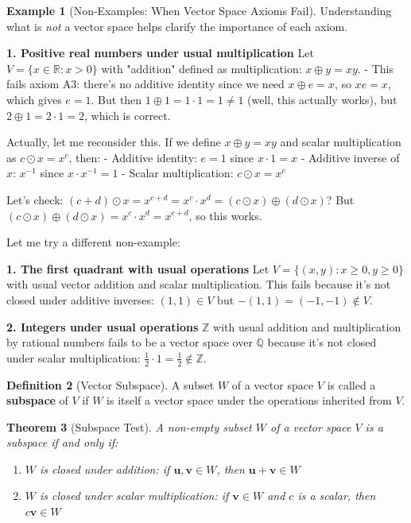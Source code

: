 \documentclass[12pt]{article}
\numberwithin{equation}{section}
\newcommand{\vect}[1]{\boldsymbol{#1}}   %
\theoremstyle{plain}
\newtheorem{theorem}{Theorem}[section]
\theoremstyle{definition}
\newtheorem{definition}[theorem]{Definition}
\newtheorem{example}[theorem]{Example}
\theoremstyle{remark}
\begin{document}
\begin{example}[Non-Examples: When Vector Space Axioms Fail]
Understanding what is \emph{not} a vector space helps clarify the importance of each axiom.

\textbf{1. Positive real numbers under usual multiplication}
Let $V = \{x \in \mathbb{R} : x > 0\}$ with "addition" defined as multiplication: $x \oplus y = xy$.
- This fails axiom A3: there's no additive identity since we need $x \oplus e = x$, so $xe = x$, which gives $e = 1$. But then $1 \oplus 1 = 1 \cdot 1 = 1 \neq 1$ (well, this actually works), but $2 \oplus 1 = 2 \cdot 1 = 2$, which is correct.

Actually, let me reconsider this. If we define $x \oplus y = xy$ and scalar multiplication as $c \odot x = x^c$, then:
- Additive identity: $e = 1$ since $x \cdot 1 = x$
- Additive inverse of $x$: $x^{-1}$ since $x \cdot x^{-1} = 1$
- Scalar multiplication: $c \odot x = x^c$

Let's check: $(c + d) \odot x = x^{c+d} = x^c \cdot x^d = (c \odot x) \oplus (d \odot x)$? 
But $(c \odot x) \oplus (d \odot x) = x^c \cdot x^d = x^{c+d}$, so this works.

Let me try a different non-example:

\textbf{1. The first quadrant with usual operations}
Let $V = \{(x,y) : x \geq 0, y \geq 0\}$ with usual vector addition and scalar multiplication.
This fails because it's not closed under additive inverses: $(1,1) \in V$ but $-(1,1) = (-1,-1) \notin V$.

\textbf{2. Integers under usual operations}
$\mathbb{Z}$ with usual addition and multiplication by rational numbers fails to be a vector space over $\mathbb{Q}$ because it's not closed under scalar multiplication: $\frac{1}{2} \cdot 1 = \frac{1}{2} \notin \mathbb{Z}$.
\end{example}

\begin{definition}[Vector Subspace]
A subset $W$ of a vector space $V$ is called a \textbf{subspace} of $V$ if $W$ is itself a vector space under the operations inherited from $V$.
\end{definition}

\begin{theorem}[Subspace Test]
A non-empty subset $W$ of a vector space $V$ is a subspace if and only if:
\begin{enumerate}
\item $W$ is closed under addition: if $\vect{u}, \vect{v} \in W$, then $\vect{u} + \vect{v} \in W$
\item $W$ is closed under scalar multiplication: if $\vect{v} \in W$ and $c$ is a scalar, then $c\vect{v} \in W$
\end{enumerate}
\end{theorem}
\end{document}

